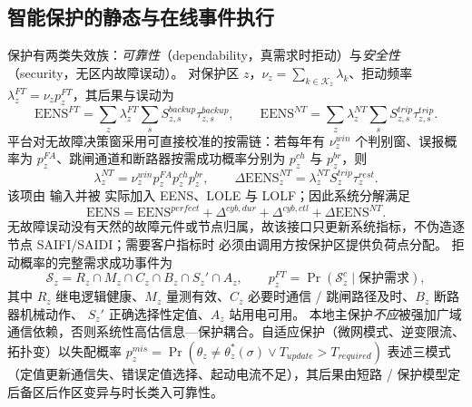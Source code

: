 \subsection{智能保护的静态与在线事件执行}\label{sec:rel-icp-protect}
保护有两类失效族：\emph{可靠性}（dependability，真需求时拒动）与\emph{安全性}（security，无区内故障误动）。
对保护区 $z$，$\nu_z=\sum_{k\in\mathcal K_z}\lambda_k$、拒动频率 $\lambda_z^{FT}=\nu_zp_z^{FT}$，其后果与误动为
\begin{equation}
 \mathrm{EENS}^{FT}=\sum_z\lambda_z^{FT}\sum_sS_{z,s}^{backup}\tau_{z,s}^{backup},\qquad
\mathrm{EENS}^{NT}=\sum_z\lambda_z^{NT}\sum_sS_{z,s}^{trip}\tau_{z,s}^{trip}.
\end{equation}
平台对无故障决策窗采用可直接校准的按需链：若每年有 $\nu_z^{win}$ 个判别窗、误报概率为
$p_z^{FA}$、跳闸通道和断路器按需成功概率分别为 $p_z^{ch}$ 与 $p_z^{br}$，则
\begin{equation}
 \lambda_z^{NT}=\nu_z^{win}p_z^{FA}p_z^{ch}p_z^{br},\qquad
 \Delta\mathrm{EENS}_z^{NT}=\lambda_z^{NT}S_z^{trip}\tau_z^{rest}.
 \label{eq:rel-icp-misoperation-runtime}
\end{equation}
该项由  输入并被
 实际加入 EENS、LOLE 与 LOLF；因此系统分解满足
\begin{equation}
 \mathrm{EENS}=\mathrm{EENS}^{perfect}+\Delta^{cyb,dur}+\Delta^{cyb,ctl}
 +\Delta\mathrm{EENS}^{NT}.
 \label{eq:rel-icp-eens-conservation}
\end{equation}
无故障误动没有天然的故障元件或节点归属，故该接口只更新系统指标，不伪造逐节点 SAIFI/SAIDI；需要客户指标时
必须由调用方按保护区提供负荷点分配。
拒动概率的完整需求成功事件为
\begin{equation}
 \mathcal S_z=R_z\cap M_z\cap C_z\cap B_z\cap S_z'\cap A_z,\qquad
 p_z^{FT}=\Pr(\mathcal S_z^c\mid\text{保护需求}),
\end{equation}
其中 $R_z$ 继电逻辑健康、$M_z$ 量测有效、$C_z$ 必要时通信 / 跳闸路径及时、$B_z$ 断路器机械动作、
$S_z'$ 正确选择性定值、$A_z$ 站用电可用。
本地主保护\emph{不应}被强加广域通信依赖，否则系统性高估信息—保护耦合。自适应保护（微网模式、逆变限流、
拓扑变）以失配概率 $p_z^{mis}=\Pr(\theta_z\ne\theta_z^*(\sigma)\lor T_{update}>T_{required})$ 表述三模式
（定值更新通信失、错误定值选择、起动电流不足），其后果由短路 / 保护模型定后备区后作区变异与时长类入可靠性。

